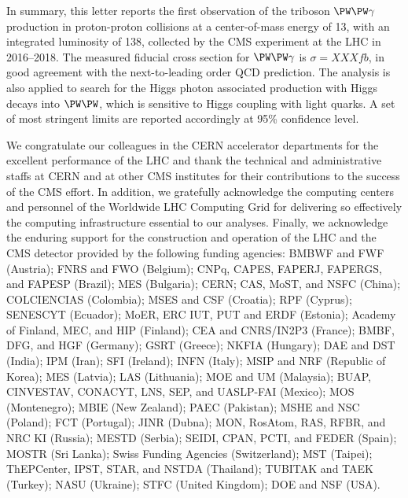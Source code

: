 In summary, this letter reports the first observation of the triboson $\PW\PW\gamma$ production in proton-proton collisions at a center-of-mass energy of 13\TeV, with an integrated luminosity of 138\fbinv, collected by the CMS experiment at the LHC in 2016--2018. The measured fiducial cross section for $\PW\PW\gamma$ is $\sigma=XXX\unit{fb}$, in good agreement with the next-to-leading order QCD prediction. 
The analysis is also applied to search for the Higgs photon associated production with Higgs decays into $\PW\PW$, which is sensitive to Higgs coupling with light quarks. A set of most stringent limits are reported accordingly at 95\% confidence level.

\begin{acknowledgments}
We congratulate our colleagues in the CERN accelerator departments for the excellent performance of the LHC and thank the technical and administrative staffs at CERN and at other CMS institutes for their contributions to the success of the CMS effort. In addition, we gratefully acknowledge the computing centers and personnel of the Worldwide LHC Computing Grid for delivering so effectively the computing infrastructure essential to our analyses. Finally, we acknowledge the enduring support for the construction and operation of the LHC and the CMS detector provided by the following funding agencies: BMBWF and FWF (Austria); FNRS and FWO (Belgium); CNPq, CAPES, FAPERJ, FAPERGS, and FAPESP (Brazil); MES (Bulgaria); CERN; CAS, MoST, and NSFC (China); COLCIENCIAS (Colombia); MSES and CSF (Croatia); RPF (Cyprus); SENESCYT (Ecuador); MoER, ERC IUT, PUT and ERDF (Estonia); Academy of Finland, MEC, and HIP (Finland); CEA and CNRS/IN2P3 (France); BMBF, DFG, and HGF (Germany); GSRT (Greece); NKFIA (Hungary); DAE and DST (India); IPM (Iran); SFI (Ireland); INFN (Italy); MSIP and NRF (Republic of Korea); MES (Latvia); LAS (Lithuania); MOE and UM (Malaysia); BUAP, CINVESTAV, CONACYT, LNS, SEP, and UASLP-FAI (Mexico); MOS (Montenegro); MBIE (New Zealand); PAEC (Pakistan); MSHE and NSC (Poland); FCT (Portugal); JINR (Dubna); MON, RosAtom, RAS, RFBR, and NRC KI (Russia); MESTD (Serbia); SEIDI, CPAN, PCTI, and FEDER (Spain); MOSTR (Sri Lanka); Swiss Funding Agencies (Switzerland); MST (Taipei); ThEPCenter, IPST, STAR, and NSTDA (Thailand); TUBITAK and TAEK (Turkey); NASU (Ukraine); STFC (United Kingdom); DOE and NSF (USA). 
\end{acknowledgments}




